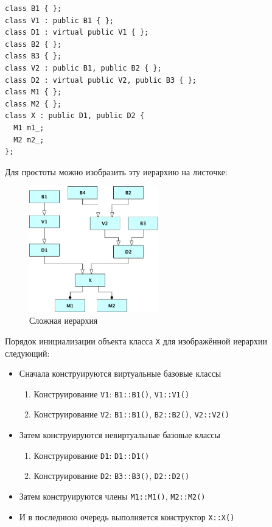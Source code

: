 \documentclass[a4paper,12pt,oneside]{article}
\begin{document}
\begin{lstlisting}
class B1 { };
class V1 : public B1 { };
class D1 : virtual public V1 { };
class B2 { };
class B3 { };
class V2 : public B1, public B2 { };
class D2 : virtual public V2, public B3 { };
class M1 { };
class M2 { };
class X : public D1, public D2 {
  M1 m1_;
  M2 m2_;
};
\end{lstlisting}

Для простоты можно изобразить эту иерархию на листочке:

\begin{figure}[h!]
\centering
\includegraphics[width=0.5\textwidth]{illustrations/complexhier-crop.pdf}
\caption{Сложная иерархия}
\label{fig:complexhier-crop}
\end{figure}

Порядок инициализации объекта класса \lstinline!X! для изображённой иерархии следующий:

\begin{itemize}
\item Сначала конструируются виртуальные базовые классы
  \begin{enumerate}
  \item Конструирование \lstinline!V1!: \lstinline!B1::B1()!, \lstinline!V1::V1()!
  \item Конструирование \lstinline!V2!: \lstinline!B1::B1()!, \lstinline!B2::B2()!, \lstinline!V2::V2()!
  \end{enumerate}
\item Затем конструируются невиртуальные базовые классы
  \begin{enumerate}
  \item Конструирование \lstinline!D1!: \lstinline!D1::D1()!
  \item Конструирование \lstinline!D2!: \lstinline!B3::B3()!, \lstinline!D2::D2()!
  \end{enumerate}
\item Затем конструируются члены \lstinline!M1::M1()!, \lstinline!M2::M2()!
\item И в последнюю очередь выполняется конструктор \lstinline!X::X()!
\end{itemize}
\end{document}
